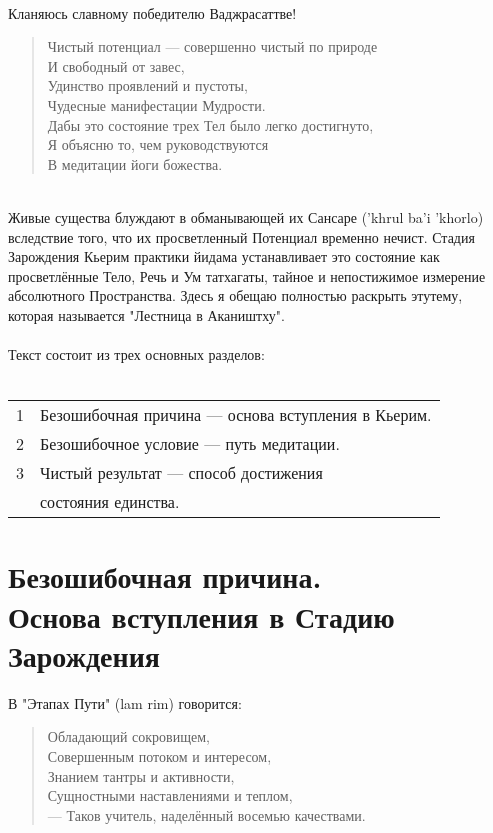 
\Section*{}
\\
Кланяюсь славному победителю Ваджрасаттве!

\begin{verse}
Чистый потенциал — совершенно чистый по природе\\
И свобод\-ный от завес,\\
Удинство проявлений и пустоты,\\
Чудесные мани\-фестации Мудрости.\\
Дабы это состояние трех Тел было легко достигнуто,\\
Я объясню то, чем руководствуются\\
В медитации йоги божества.\\
\end{verse}
\\
Живые существа блуждают в обманывающей их Сансаре ('khrul ba'i 'khorlo)
вследствие того, что их просветленный Потенциал временно нечист.
Стадия Зарождения Кьерим практики йидама устанавливает это
состояние как просветлённые Тело, Речь и Ум татхагаты, тайное
и непостижимое измерение абсолютного Пространства. Здесь я
обещаю полностью раскрыть этутему, которая называется
"Лестница в Акаништху".\\
\\
Текст состоит из трех основных разделов:\\
\\
\begin{tabular}{ll}
1 & Безошибочная причина — основа вступления в Кьерим.\\
2 & Безошибочное условие — путь медитации.\\
3 & Чистый результат — способ достижения \\
  & состояния единства.\\
\end{tabular}
\newpage
\section{Безошибочная причина.\\Основа вступления в Стадию Зарождения}

\vspace{1cm}
В "Этапах Пути" (lam rim) говорится:

\begin{verse}
Обладающий сокровищем,\\
Совершенным потоком и интересом,\\
Знанием тантры и активности,\\
Сущностными наставлениями и теплом,\\
— Таков учитель, наделённый восемью качествами.
\end{verse}

